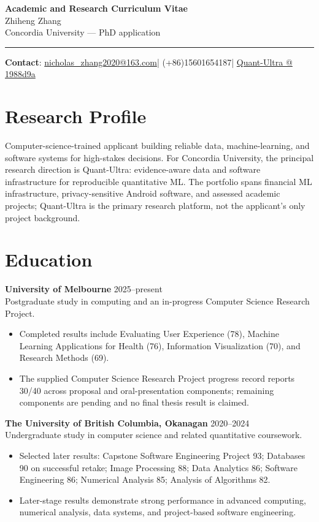 \documentclass[11pt]{article}
\makeatletter
\newcommand{\ApplicantName}{Zhiheng Zhang}
\newcommand{\ApplicantEmail}{\href{mailto:nicholas_zhang2020@163.com}{nicholas\_zhang2020@163.com}}
\newcommand{\ApplicantPhone}{(+86)15601654187}
\newcommand{\ApplicantGitHub}{\href{https://github.com/zhiheng-zhang-Mera/Quant-Ultra/tree/1988d9a8530da91a8158de864d098ea869098923}{Quant-Ultra @ 1988d9a}}
\makeatother
\begin{document}
\begin{center}
{\LARGE\bfseries Academic and Research Curriculum Vitae}\\[0.25em]
{\large \ApplicantName}\\
Concordia University --- PhD application
\end{center}
\vspace{0.35em}\hrule\vspace{0.65em}

\textbf{Contact}: \ApplicantEmail\quad | \quad \ApplicantPhone\quad | \quad \ApplicantGitHub

\section*{Research Profile}
Computer-science-trained applicant building reliable data, machine-learning, and software systems for high-stakes decisions. For Concordia University, the principal research direction is Quant-Ultra: evidence-aware data and software infrastructure for reproducible quantitative ML. The portfolio spans financial ML infrastructure, privacy-sensitive Android software, and assessed academic projects; Quant-Ultra is the primary research platform, not the applicant's only project background.

\section*{Education}
\textbf{University of Melbourne} \hfill 2025--present\\
Postgraduate study in computing and an in-progress Computer Science Research Project.
\begin{itemize}
\item Completed results include Evaluating User Experience (78), Machine Learning Applications for Health (76), Information Visualization (70), and Research Methods (69).
\item The supplied Computer Science Research Project progress record reports 30/40 across proposal and oral-presentation components; remaining components are pending and no final thesis result is claimed.
\end{itemize}

\textbf{The University of British Columbia, Okanagan} \hfill 2020--2024\\
Undergraduate study in computer science and related quantitative coursework.
\begin{itemize}
\item Selected later results: Capstone Software Engineering Project 93; Databases 90 on successful retake; Image Processing 88; Data Analytics 86; Software Engineering 86; Numerical Analysis 85; Analysis of Algorithms 82.
\item Later-stage results demonstrate strong performance in advanced computing, numerical analysis, data systems, and project-based software engineering.
\end{itemize}
\end{document}
